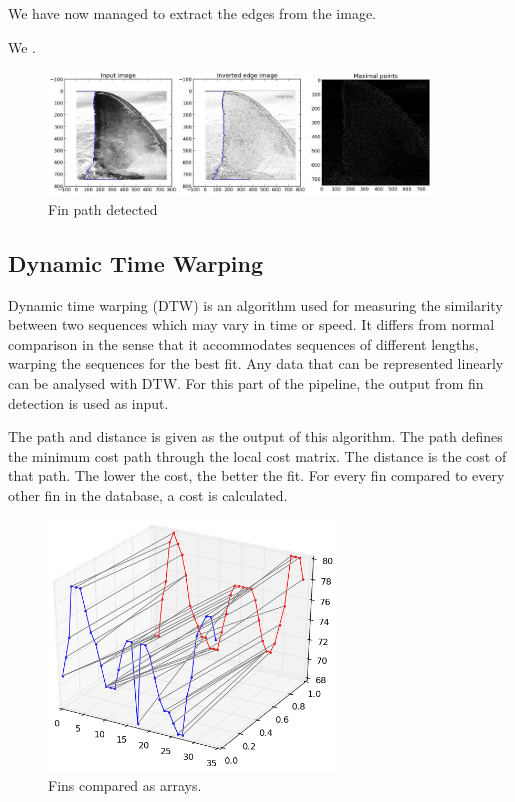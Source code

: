 \documentclass[a4paper,10pt]{article}
\begin{document}
We have now managed to extract the edges from the image.

We .

\begin{figure}[H]
 \centering
 \includegraphics[width=4in]{finpath.jpg}
 \caption{Fin path detected}
 \label{fin}
\end{figure}



\subsection{Dynamic Time Warping}
Dynamic time warping (DTW) is an algorithm used for measuring the similarity between two sequences which may vary in time or speed.
It differs from normal comparison in the sense that it accommodates sequences of different lengths, warping the sequences for the best fit.
Any data that can be represented linearly can be analysed with DTW.  For this part of the pipeline, the output from fin detection is used as input.

The path and distance is given as the output of this algorithm. The path defines the minimum cost path through the local cost matrix. 
The distance is the cost of that path. 
The lower the cost, the better the fit. For every fin compared to every other fin in the database, a cost is calculated.


\begin{figure}[H]
 \centering
 \includegraphics[width=3in]{dtw.jpg}
 \caption{Fins compared as arrays.}
 \label{dtw}
\end{figure}
\end{document}

